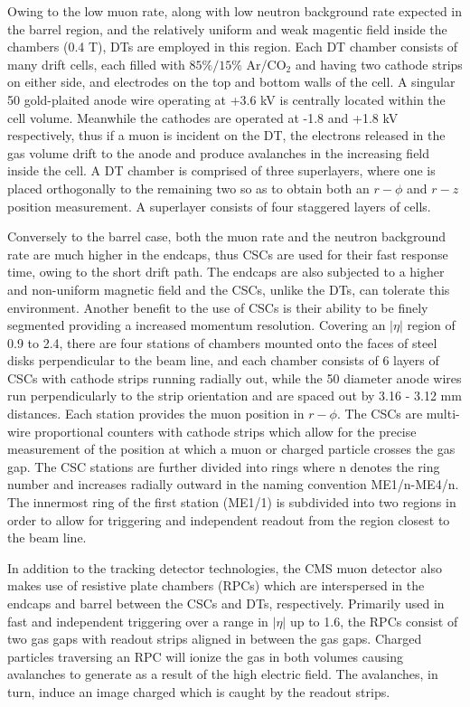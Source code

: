 Owing to the low muon rate, along with low neutron background rate expected in the barrel region, and the relatively uniform and weak magentic field inside the chambers (0.4 T), DTs are employed in this region. Each DT chamber consists of many drift cells, each filled with $85\%/15\%$ Ar/CO$_2$ and having two cathode strips on either side, and electrodes on the top and bottom walls of the cell. A singular 50 \mum gold-plaited anode wire operating at +3.6 kV is centrally located within the cell volume. Meanwhile the cathodes are operated at -1.8 and +1.8 kV respectively, thus if a muon is incident on the DT, the electrons released in the gas volume drift to the anode and produce avalanches in the increasing field inside the cell. A DT chamber is comprised of three superlayers, where one is placed orthogonally to the remaining two so as to obtain both an $r-\phi$ and $r-z$ position measurement. A superlayer consists of four staggered layers of cells.

Conversely to the barrel case, both the muon rate and the neutron background rate are much higher in the endcaps, thus CSCs are used for their fast response time, owing to the short drift path. The endcaps are also subjected to a higher and non-uniform magnetic field and the CSCs, unlike the DTs, can tolerate this environment. Another benefit to the use of CSCs is their ability to be finely segmented providing a increased momentum resolution. Covering an $|\eta|$ region of 0.9 to 2.4, there are four stations of chambers mounted onto the faces of steel disks perpendicular to the beam line, and each chamber consists of 6 layers of CSCs with cathode strips running radially out, while the 50 \mum diameter anode wires run perpendicularly to the strip orientation and are spaced out by 3.16 - 3.12 mm distances. Each station provides the muon position in $r-\phi$. The CSCs are multi-wire proportional counters with cathode strips which allow for the precise measurement of the position at which a muon or charged particle crosses the gas gap. The CSC stations are further divided into rings where n denotes the ring number and increases radially outward in the naming convention ME1/n-ME4/n. The innermost ring of the first station (ME1/1) is subdivided into two regions in order to allow for triggering and independent readout from the region closest to the beam line. 

In addition to the tracking detector technologies, the CMS muon detector also makes use of resistive plate chambers (RPCs) which are interspersed in the endcaps and barrel between the CSCs and DTs, respectively. Primarily used in fast and independent triggering over a range in $|\eta|$ up to 1.6, the RPCs consist of two gas gaps with readout strips aligned in \eta between the gas gaps. Charged particles traversing an RPC will ionize the gas in both volumes causing avalanches to generate as a result of the high electric field. The avalanches, in turn, induce an image charged which is caught by the readout strips. 

